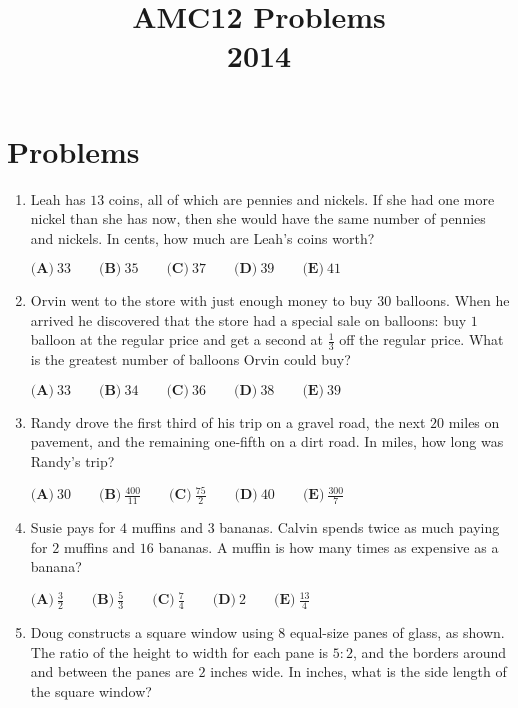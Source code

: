 \documentclass{article}
\title{AMC12 Problems \\ 2014}
\date{}
\begin{document}
\maketitle\thispagestyle{fancy}\newpage\section*{Problems}\begin{enumerate}[label=\arabic*., itemsep=0.5em]\item Leah has $ 13 $ coins, all of which are pennies and nickels. If she had one more nickel than she has now, then she would have the same number of pennies and nickels. In cents, how much are Leah's coins worth?

$ \textbf{(A)}\ 33\qquad\textbf{(B)}\ 35\qquad\textbf{(C)}\ 37\qquad\textbf{(D)}\ 39\qquad\textbf{(E)}\ 41 $\par \vspace{0.5em}\item Orvin went to the store with just enough money to buy $ 30 $ balloons. When he arrived he discovered that the store had a special sale on balloons: buy $ 1 $ balloon at the regular price and get a second at $ \frac{1}{3} $ off the regular price. What is the greatest number of balloons Orvin could buy?

$ \textbf{(A)}\ 33\qquad\textbf{(B)}\ 34\qquad\textbf{(C)}\ 36\qquad\textbf{(D)}\ 38\qquad\textbf{(E)}\ 39 $\par \vspace{0.5em}\item Randy drove the first third of his trip on a gravel road, the next $ 20 $ miles on pavement, and the remaining one-fifth on a dirt road. In miles, how long was Randy's trip?

$ \textbf{(A)}\ 30\qquad\textbf{(B)}\ \frac{400}{11}\qquad\textbf{(C)}\ \frac{75}{2}\qquad\textbf{(D)}\ 40\qquad\textbf{(E)}\ \frac{300}{7} $\par \vspace{0.5em}\item Susie pays for $ 4 $ muffins and $ 3 $ bananas. Calvin spends twice as much paying for $ 2 $ muffins and $ 16 $ bananas. A muffin is how many times as expensive as a banana?

$ \textbf{(A)}\ \frac{3}{2}\qquad\textbf{(B)}\ \frac{5}{3}\qquad\textbf{(C)}\ \frac{7}{4}\qquad\textbf{(D)}\ 2\qquad\textbf{(E)}\ \frac{13}{4} $\par \vspace{0.5em}\item Doug constructs a square window using $ 8 $ equal-size panes of glass, as shown. The ratio of the height to width for each pane is $ 5 : 2 $, and the borders around and between the panes are $ 2 $ inches wide. In inches, what is the side length of the square window?


\end{enumerate}
\end{document}
